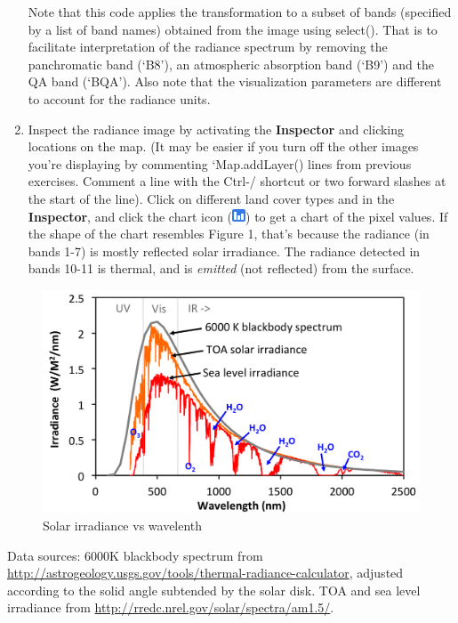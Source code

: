 \documentclass[
]{article}
\begin{document}
\begin{enumerate}
  Note that this code applies the transformation to a subset of bands (specified by a list of band names) obtained from the image using select(). That is to facilitate interpretation of the radiance spectrum by removing the panchromatic band (`B8'), an atmospheric absorption band (`B9') and the QA band (`BQA'). Also note that the visualization parameters are different to account for the radiance units.
\item
  Inspect the radiance image by activating the \textbf{Inspector} and clicking locations on the map. (It may be easier if you turn off the other images you're displaying by commenting `Map.addLayer() lines from previous exercises. Comment a line with the Ctrl-/ shortcut or two forward slashes at the start of the line). Click on different land cover types and in the \textbf{Inspector}, and click the chart icon (\includegraphics{chart_icon_gee.png}) to get a chart of the pixel values. If the shape of the chart resembles Figure 1, that's because the radiance (in bands 1-7) is mostly reflected solar irradiance. The radiance detected in bands 10-11 is thermal, and is \emph{emitted} (not reflected) from the surface.
\end{enumerate}

\begin{figure}

{\centering \includegraphics[width=0.95\linewidth]{irradiance_wavelength} 

}

\caption{Solar irradiance vs wavelenth}\label{fig:irradiancewavelength}
\end{figure}

Data sources: 6000K blackbody spectrum from \url{http://astrogeology.usgs.gov/tools/thermal-radiance-calculator}, adjusted according to the solid angle subtended by the solar disk. TOA and sea level irradiance from \url{http://rredc.nrel.gov/solar/spectra/am1.5/}.
\end{document}
